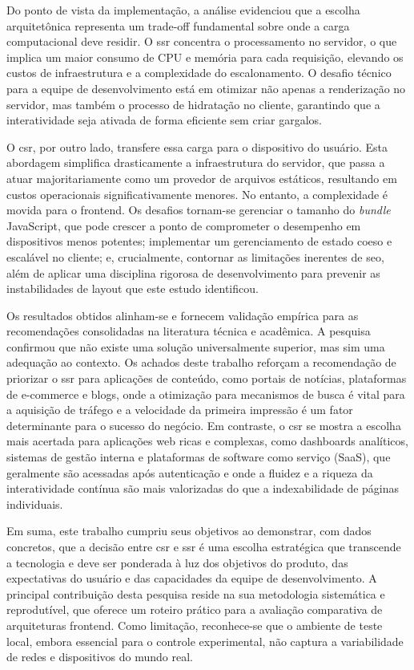 Do ponto de vista da implementação, a análise evidenciou que a escolha arquitetônica representa um trade-off fundamental sobre onde a carga computacional deve residir. O \acrshort{ssr} concentra o processamento no servidor, o que implica um maior consumo de CPU e memória para cada requisição, elevando os custos de infraestrutura e a complexidade do escalonamento. O desafio técnico para a equipe de desenvolvimento está em otimizar não apenas a renderização no servidor, mas também o processo de hidratação no cliente, garantindo que a interatividade seja ativada de forma eficiente sem criar gargalos.

O \acrshort{csr}, por outro lado, transfere essa carga para o dispositivo do usuário. Esta abordagem simplifica drasticamente a infraestrutura do servidor, que passa a atuar majoritariamente como um provedor de arquivos estáticos, resultando em custos operacionais significativamente menores. No entanto, a complexidade é movida para o frontend. Os desafios tornam-se gerenciar o tamanho do \textit{bundle} JavaScript, que pode crescer a ponto de comprometer o desempenho em dispositivos menos potentes; implementar um gerenciamento de estado coeso e escalável no cliente; e, crucialmente, contornar as limitações inerentes de \acrshort{seo}, além de aplicar uma disciplina rigorosa de desenvolvimento para prevenir as instabilidades de layout que este estudo identificou.

Os resultados obtidos alinham-se e fornecem validação empírica para as recomendações consolidadas na literatura técnica e acadêmica. A pesquisa confirmou que não existe uma solução universalmente superior, mas sim uma adequação ao contexto. Os achados deste trabalho reforçam a recomendação de priorizar o \acrshort{ssr} para aplicações de conteúdo, como portais de notícias, plataformas de e-commerce e blogs, onde a otimização para mecanismos de busca é vital para a aquisição de tráfego e a velocidade da primeira impressão é um fator determinante para o sucesso do negócio. Em contraste, o \acrshort{csr} se mostra a escolha mais acertada para aplicações web ricas e complexas, como dashboards analíticos, sistemas de gestão interna e plataformas de software como serviço (SaaS), que geralmente são acessadas após autenticação e onde a fluidez e a riqueza da interatividade contínua são mais valorizadas do que a indexabilidade de páginas individuais.

Em suma, este trabalho cumpriu seus objetivos ao demonstrar, com dados concretos, que a decisão entre \acrshort{csr} e \acrshort{ssr} é uma escolha estratégica que transcende a tecnologia e deve ser ponderada à luz dos objetivos do produto, das expectativas do usuário e das capacidades da equipe de desenvolvimento. A principal contribuição desta pesquisa reside na sua metodologia sistemática e reprodutível, que oferece um roteiro prático para a avaliação comparativa de arquiteturas frontend. Como limitação, reconhece-se que o ambiente de teste local, embora essencial para o controle experimental, não captura a variabilidade de redes e dispositivos do mundo real.

